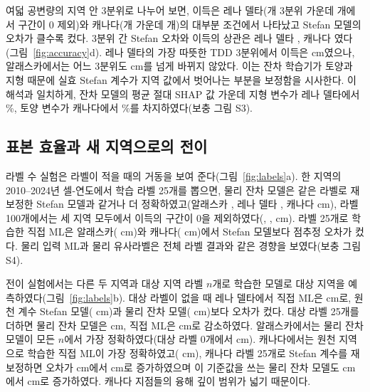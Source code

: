 여덟 공변량의 지역 안 3분위로 나누어 보면, 이득은 레나 델타(\ngcLecells{}개 3분위 가운데 \ngcLesig{}개에서 구간이 0 제외)와 캐나다(\ngcCacells{}개 가운데 \ngcCasig{}개)의 대부분 조건에서 나타났고 Stefan 모델의 오차가 클수록 컸다. 3분위 간 Stefan 오차와 이득의 상관은 레나 델타 \ngcLecorr, 캐나다 \ngcCacorr{}였다(그림~\ref{fig:accuracy}d). 레나 델타의 가장 따뜻한 TDD 3분위에서 이득은 \ndtddLewarm{} cm였으나, 알래스카에서는 어느 3분위도 \ngcAkmaxabs{} cm를 넘게 바뀌지 않았다. 이는 잔차 학습기가 토양과 지형 때문에 실효 Stefan 계수가 지역 값에서 벗어나는 부분을 보정함을 시사한다. 이 해석과 일치하게, 잔차 모델의 평균 절대 SHAP 값 가운데 지형 변수가 레나 델타에서 \nshapLeResTerrain\%, 토양 변수가 캐나다에서 \nshapCaResSoil\%를 차지하였다(보충 그림 S3).

\subsection{표본 효율과 새 지역으로의 전이}
라벨 수 실험은 라벨이 적을 때의 거동을 보여 준다(그림~\ref{fig:labels}a). 한 지역의 2010--2024년 셀-연도에서 학습 라벨 25개를 뽑으면, 물리 잔차 모델은 같은 라벨로 재보정한 Stefan 모델과 같거나 더 정확하였고(알래스카 \nllAkRotwfive, 레나 델타 \nllLeRotwfive, 캐나다 \nllCaRotwfive{} cm), 라벨 100개에서는 세 지역 모두에서 이득의 구간이 0을 제외하였다(\nllAkRohundred, \nllLeRohundred, \nllCaRohundred{} cm). 라벨 25개로 학습한 직접 ML은 알래스카(\nllAkDztwfive{} cm)와 캐나다(\nllCaDztwfive{} cm)에서 Stefan 모델보다 점추정 오차가 컸다. 물리 입력 ML과 물리 유사라벨은 전체 라벨 결과와 같은 경향을 보였다(보충 그림 S4).


전이 실험에서는 다른 두 지역과 대상 지역 라벨 $n$개로 학습한 모델로 대상 지역을 예측하였다(그림~\ref{fig:labels}b). 대상 라벨이 없을 때 레나 델타에서 직접 ML은 \ntlrmseLeDszero{} cm로, 원천 계수 Stefan 모델(\ntlrmseLePzzero{} cm)과 물리 잔차 모델(\ntlrmseLeRszero{} cm)보다 오차가 컸다. 대상 라벨 25개를 더하면 물리 잔차 모델은 \ntlrmseLeRstwfive{} cm, 직접 ML은 \ntlrmseLeDstwfive{} cm로 감소하였다. 알래스카에서는 물리 잔차 모델이 모든 $n$에서 가장 정확하였다(대상 라벨 0개에서 \ntlrmseAkRszero{} cm). 캐나다에서는 원천 지역으로 학습한 직접 ML이 가장 정확하였고(\ntlrmseCaDszero{} cm), 캐나다 라벨 25개로 Stefan 계수를 재보정하면 오차가 \ntlrmseCaPzzero{} cm에서 \ntlrmseCaPntwfive{} cm로 증가하였으며 이 기준값을 쓰는 물리 잔차 모델도 \ntlrmseCaRszero{} cm에서 \ntlrmseCaRstwfive{} cm로 증가하였다. 캐나다 지점들의 융해 깊이 범위가 넓기 때문이다.


